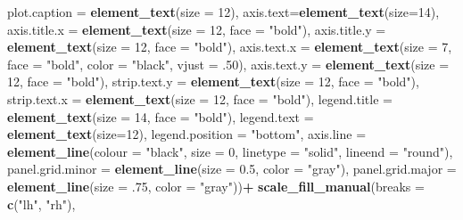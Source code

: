 \documentclass[
]{article}
\newenvironment{Shaded}{\begin{snugshade}}{\end{snugshade}}
\newcommand{\DataTypeTok}[1]{\textcolor[rgb]{0.13,0.29,0.53}{#1}}
\newcommand{\DecValTok}[1]{\textcolor[rgb]{0.00,0.00,0.81}{#1}}
\newcommand{\FloatTok}[1]{\textcolor[rgb]{0.00,0.00,0.81}{#1}}
\newcommand{\KeywordTok}[1]{\textcolor[rgb]{0.13,0.29,0.53}{\textbf{#1}}}
\newcommand{\NormalTok}[1]{#1}
\newcommand{\OperatorTok}[1]{\textcolor[rgb]{0.81,0.36,0.00}{\textbf{#1}}}
\newcommand{\StringTok}[1]{\textcolor[rgb]{0.31,0.60,0.02}{#1}}
\begin{document}
\begin{Shaded}
\begin{Highlighting}[]
{{        \DataTypeTok{plot.caption =} \KeywordTok{element_text}\NormalTok{(}\DataTypeTok{size =} \DecValTok{12}\NormalTok{),}
        \DataTypeTok{axis.text=}\KeywordTok{element_text}\NormalTok{(}\DataTypeTok{size=}\DecValTok{14}\NormalTok{),}
        \DataTypeTok{axis.title.x =} \KeywordTok{element_text}\NormalTok{(}\DataTypeTok{size =} \DecValTok{12}\NormalTok{, }\DataTypeTok{face =} \StringTok{"bold"}\NormalTok{),}
        \DataTypeTok{axis.title.y =} \KeywordTok{element_text}\NormalTok{(}\DataTypeTok{size =} \DecValTok{12}\NormalTok{, }\DataTypeTok{face =} \StringTok{"bold"}\NormalTok{),}
        \DataTypeTok{axis.text.x =} \KeywordTok{element_text}\NormalTok{(}\DataTypeTok{size =} \DecValTok{7}\NormalTok{, }\DataTypeTok{face =} \StringTok{"bold"}\NormalTok{, }\DataTypeTok{color =} \StringTok{"black"}\NormalTok{, }\DataTypeTok{vjust =} \FloatTok{.50}\NormalTok{),}
        \DataTypeTok{axis.text.y =} \KeywordTok{element_text}\NormalTok{(}\DataTypeTok{size =} \DecValTok{12}\NormalTok{, }\DataTypeTok{face =} \StringTok{"bold"}\NormalTok{),}
        \DataTypeTok{strip.text.y =} \KeywordTok{element_text}\NormalTok{(}\DataTypeTok{size =} \DecValTok{12}\NormalTok{, }\DataTypeTok{face =} \StringTok{"bold"}\NormalTok{),}
        \DataTypeTok{strip.text.x =} \KeywordTok{element_text}\NormalTok{(}\DataTypeTok{size =} \DecValTok{12}\NormalTok{, }\DataTypeTok{face =} \StringTok{"bold"}\NormalTok{),}
        \DataTypeTok{legend.title =} \KeywordTok{element_text}\NormalTok{(}\DataTypeTok{size =} \DecValTok{14}\NormalTok{, }\DataTypeTok{face =} \StringTok{"bold"}\NormalTok{), }
        \DataTypeTok{legend.text =} \KeywordTok{element_text}\NormalTok{(}\DataTypeTok{size=}\DecValTok{12}\NormalTok{),}
        \DataTypeTok{legend.position =} \StringTok{"bottom"}\NormalTok{,}
        \DataTypeTok{axis.line =} \KeywordTok{element_line}\NormalTok{(}\DataTypeTok{colour =} \StringTok{"black"}\NormalTok{, }
                                 \DataTypeTok{size =} \DecValTok{0}\NormalTok{, }\DataTypeTok{linetype =} \StringTok{"solid"}\NormalTok{, }\DataTypeTok{lineend =} \StringTok{"round"}\NormalTok{),}
        \DataTypeTok{panel.grid.minor =} \KeywordTok{element_line}\NormalTok{(}\DataTypeTok{size =} \FloatTok{0.5}\NormalTok{, }\DataTypeTok{color =} \StringTok{"gray"}\NormalTok{), }
        \DataTypeTok{panel.grid.major =} \KeywordTok{element_line}\NormalTok{(}\DataTypeTok{size =} \FloatTok{.75}\NormalTok{, }\DataTypeTok{color =} \StringTok{"gray"}\NormalTok{))}\OperatorTok{+}
\StringTok{  }\KeywordTok{scale_fill_manual}\NormalTok{(}\DataTypeTok{breaks =} \KeywordTok{c}\NormalTok{(}\StringTok{"lh"}\NormalTok{, }\StringTok{"rh"}\NormalTok{), }
}}
\end{Highlighting}
\end{Shaded}
\end{document}
